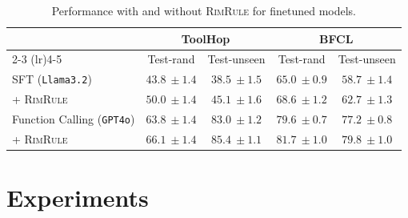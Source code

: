\documentclass[11pt]{article}
\newcommand{\shortname}{\textsc{RimRule}\xspace}
\begin{document}
\begin{table}[t]
\small

\caption{Performance with and without \shortname for finetuned models.}

\vspace{0.4em}  %
\label{tab:vs_finetune}
\centering
\setlength{\tabcolsep}{8pt}
\renewcommand{\arraystretch}{1.12}
\begin{tabular}{@{}l|cc|cc@{}}
\toprule
             & \multicolumn{2}{c|}{\textbf{ToolHop}} & \multicolumn{2}{c}{\textbf{BFCL}} \\ 
\cmidrule(lr){2-3} \cmidrule(lr){4-5}
             & Test-rand & Test-unseen & Test-rand & Test-unseen \\ 
             
\midrule

SFT (\texttt{Llama3.2})
& $43.8 \scriptstyle ~\pm 1.4$ & $38.5 \scriptstyle ~\pm 1.5$
& $65.0 \scriptstyle ~\pm 0.9$ & $58.7 \scriptstyle ~\pm 1.4$ \\ 

+ \shortname          
& $\mathbf{50.0} \scriptstyle ~\pm 1.4$ & $\mathbf{45.1} \scriptstyle ~\pm 1.6$
& $\mathbf{68.6} \scriptstyle ~\pm 1.2$ & 
$\mathbf{62.7} \scriptstyle ~\pm 1.3$    %
\\ 

\midrule

Function Calling  (\texttt{GPT4o})        
& $63.8\scriptstyle ~\pm 1.4$ & $ 83.0 \scriptstyle ~\pm 1.2$
& $79.6 \scriptstyle ~\pm 0.7$ & $77.2 \scriptstyle ~\pm 0.8$ \\ 

+ \shortname          
& $\mathbf{66.1} \scriptstyle ~\pm 1.4$ & $\mathbf{85.4} \scriptstyle ~\pm 1.1$
& $\mathbf{81.7} \scriptstyle ~\pm 1.0$ & $\mathbf{79.8} \scriptstyle ~\pm 1.0$ 
\\ 


\bottomrule
\end{tabular}
\end{table}


%


\section{Experiments}


\end{document}
